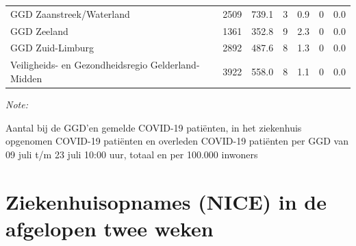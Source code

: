 \documentclass[
  english,
  man,floatsintext]{apa6}
\begin{document}
\begin{table}
\begin{threeparttable}
\begin{tabular}{lrrrrrr}
GGD Zaanstreek/Waterland & 2509 & 739.1 & 3 & 0.9 & 0 & 0.0\\
GGD Zeeland & 1361 & 352.8 & 9 & 2.3 & 0 & 0.0\\
GGD Zuid-Limburg & 2892 & 487.6 & 8 & 1.3 & 0 & 0.0\\
Veiligheids- en Gezondheidsregio Gelderland-Midden & 3922 & 558.0 & 8 & 1.1 & 0 & 0.0\\
\bottomrule
\end{tabular}
\begin{tablenotes}
\item \textit{Note: } 
\item Aantal bij de GGD’en gemelde COVID-19 patiënten, in het ziekenhuis opgenomen COVID-19 patiënten en overleden COVID-19 patiënten per GGD van 09 juli t/m 23 juli 10:00 uur, totaal en per 100.000 inwoners
\end{tablenotes}
\end{threeparttable}
\endgroup{}
\end{table}

\newpage

\hypertarget{ziekenhuisopnames-nice-in-de-afgelopen-twee-weken}{%
\section{Ziekenhuisopnames (NICE) in de afgelopen twee weken}\label{ziekenhuisopnames-nice-in-de-afgelopen-twee-weken}}
\end{document}
